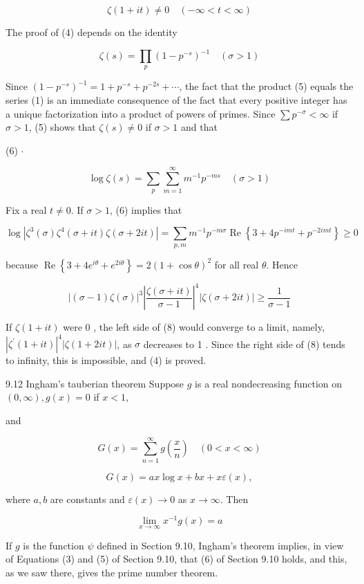 \documentclass[10pt]{article}
\begin{document}
$$
\zeta(1+i t) \neq 0 \quad(-\infty<t<\infty)
$$

The proof of (4) depends on the identity

$$
\zeta(s)=\prod_{p}\left(1-p^{-s}\right)^{-1} \quad(\sigma>1)
$$

Since $\left(1-p^{-s}\right)^{-1}=1+p^{-s}+p^{-2 s}+\cdots$, the fact that the product (5) equals the series (1) is an immediate consequence of the fact that every positive integer has a unique factorization into a product of powers of primes. Since $\sum p^{-\sigma}<\infty$ if $\sigma>1$, (5) shows that $\zeta(s) \neq 0$ if $\sigma>1$ and that

(6) $\cdot$

$$
\log \zeta(s)=\sum_{p} \sum_{m=1}^{\infty} m^{-1} p^{-m s} \quad(\sigma>1)
$$

Fix a real $t \neq 0$. If $\sigma>1$, (6) implies that

$$
\log \left|\zeta^{3}(\sigma) \zeta^{4}(\sigma+i t) \zeta(\sigma+2 i t)\right|=\sum_{p, m} m^{-1} p^{-m \sigma} \operatorname{Re}\left\{3+4 p^{-i m t}+p^{-2 i m t}\right\} \geq 0
$$

because $\operatorname{Re}\left\{3+4 e^{i \theta}+e^{2 i \theta}\right\}=2(1+\cos \theta)^{2}$ for all real $\theta$. Hence

$$
|(\sigma-1) \zeta(\sigma)|^{3}\left|\frac{\zeta(\sigma+i t)}{\sigma-1}\right|^{4}|\zeta(\sigma+2 i t)| \geq \frac{1}{\sigma-1}
$$

If $\zeta(1+i t)$ were 0 , the left side of (8) would converge to a limit, namely, $\left|\zeta^{\prime}(1+i t)\right|^{4}|\zeta(1+2 i t)|$, as $\sigma$ decreases to 1 . Since the right side of (8) tends to infinity, this is impossible, and (4) is proved.

9.12 Ingham's tauberian theorem Suppose $g$ is a real nondecreasing function on $(0, \infty), g(x)=0$ if $x<1$,

and

$$
G(x)=\sum_{n=1}^{\infty} g\left(\frac{x}{n}\right) \quad(0<x<\infty)
$$

$$
G(x)=a x \log x+b x+x \varepsilon(x),
$$

where $a, b$ are constants and $\varepsilon(x) \rightarrow 0$ as $x \rightarrow \infty$. Then

$$
\lim _{x \rightarrow \infty} x^{-1} g(x)=a
$$

If $g$ is the function $\psi$ defined in Section 9.10, Ingham's theorem implies, in view of Equations (3) and (5) of Section 9.10, that (6) of Section 9.10 holds, and this, as we saw there, gives the prime number theorem.
\end{document}
